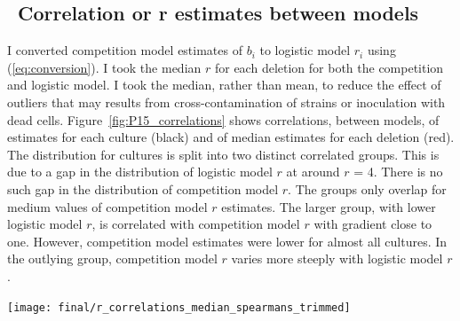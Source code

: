 \subsection{\thesubsection~Correlation or r estimates between models}




I converted competition model estimates of \(b_{i}\) to logistic model
\(r_{i}\) using (\ref{eq:conversion}). I took the median \(r\) for
each deletion for both the competition and logistic model. I took the
median, rather than mean, to reduce the effect of outliers that may
results from cross-contamination of strains or inoculation with dead
cells. Figure~\ref{fig:P15_correlations} shows correlations, between
models, of estimates for each culture (black) and of median estimates
for each deletion (red). The distribution for cultures is split into
two distinct correlated groups. This is due to a gap in the
distribution of logistic model \(r\) at around \(r\) = 4. There is no
such gap in the distribution of competition model \(r\). The groups
only overlap for medium values of competition model \(r\)
estimates. The larger group, with lower logistic model \(r\), is
correlated with competition model \(r\) with gradient close to
one. However, competition model estimates were lower for almost all
cultures. In the outlying group, competition model \(r\) varies more
steeply with logistic model \(r\).

\graphicspath{{images/p15_correlations/}}
\begin{Figure}
  \centering
  \texttt{[image: final/r\_correlations\_median\_spearmans\_trimmed]}
  \label{fig:P15_correlations}
\end{Figure}


